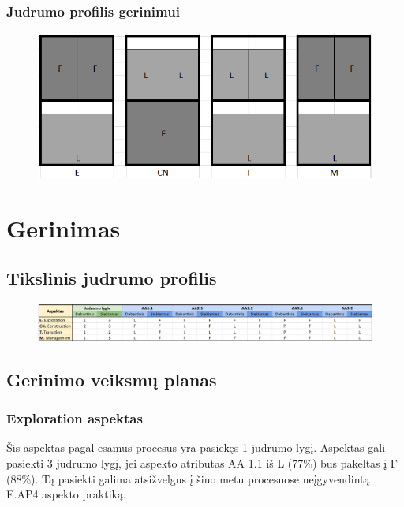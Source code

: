 \documentclass{article}
\begin{document}
\subsubsection{Judrumo profilis gerinimui}

\begin{figure}[h]
    \centering
    \includegraphics[width=0.75\linewidth]{task-2/images/blokai.png}
    \label{fig:enter-label}
\end{figure}

\section{Gerinimas}

\subsection{Tikslinis judrumo profilis}

\begin{figure}[h]
    \centering
    \includegraphics[width=0.75\linewidth]{task-2/images/tikslinis-profilis.png}
    \label{fig:enter-label}
\end{figure}

\newpage
\subsection{Gerinimo veiksmų planas}

\subsubsection{Exploration aspektas}

Šis aspektas pagal esamus procesus yra pasiekęs 1 judrumo lygį. Aspektas gali pasiekti 3 judrumo lygį, jei aspekto atributas
AA 1.1 iš L (77\%) bus pakeltas į F (88\%). Tą pasiekti galima atsižvelgus į šiuo metu procesuose neįgyvendintą E.AP4 aspekto praktiką.
\end{document}

